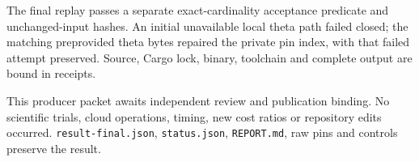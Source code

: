 \documentclass[10pt]{article}\usepackage[margin=0.8in]{geometry}\usepackage[T1]{fontenc}\usepackage{lmodern,amsmath,hyperref}
\begin{document}
The final replay passes a separate exact-cardinality acceptance predicate and unchanged-input hashes. An initial unavailable local theta path failed closed; the matching preprovided theta bytes repaired the private pin index, with that failed attempt preserved. Source, Cargo lock, binary, toolchain and complete output are bound in receipts.

This producer packet awaits independent review and publication binding. No scientific trials, cloud operations, timing, new cost ratios or repository edits occurred. \texttt{result-final.json}, \texttt{status.json}, \texttt{REPORT.md}, raw pins and controls preserve the result.
\end{document}
